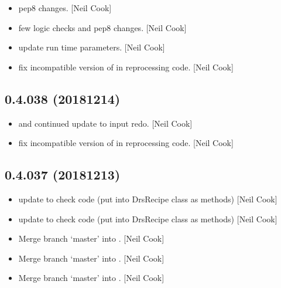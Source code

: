 \documentclass[a4paper,10pt,english]{report}
\begin{document}
\begin{itemize}
\item {} 
 \sphinxhyphen{} pep8 changes. {[}Neil Cook{]}

\item {} 
 \sphinxhyphen{} few logic checks and pep8 changes. {[}Neil
Cook{]}

\item {} 
 \sphinxhyphen{} update run time parameters. {[}Neil Cook{]}

\item {} 
 \sphinxhyphen{} fix incompatible version of  in
reprocessing code. {[}Neil Cook{]}

\end{itemize}


\subsection{0.4.038 (2018\sphinxhyphen{}12\sphinxhyphen{}14)}
\label{\detokenize{misc/changelog:id252}}\begin{itemize}
\item {} 
 and  \sphinxhyphen{} continued update to input
redo. {[}Neil Cook{]}

\item {} 
 \sphinxhyphen{} fix incompatible version of  in
reprocessing code. {[}Neil Cook{]}

\end{itemize}


\subsection{0.4.037 (2018\sphinxhyphen{}12\sphinxhyphen{}13)}
\label{\detokenize{misc/changelog:id253}}\begin{itemize}
\item {} 
 \sphinxhyphen{} update to check code (put into DrsRecipe class as
methods) {[}Neil Cook{]}

\item {} 
 \sphinxhyphen{} update to check code (put into DrsRecipe class as
methods) {[}Neil Cook{]}

\item {} 
Merge branch ‘master’ into . {[}Neil Cook{]}

\item {} 
Merge branch ‘master’ into . {[}Neil Cook{]}

\item {} 
Merge branch ‘master’ into . {[}Neil Cook{]}

\end{itemize}
\end{document}
